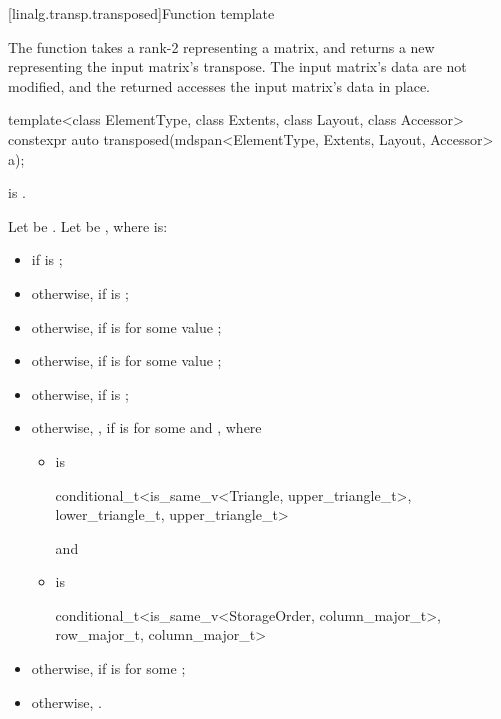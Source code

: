 [linalg.transp.transposed]{Function template }

\pnum
The  function
takes a rank-2  representing a matrix, and
returns a new  representing the input matrix's transpose.
The input matrix's data are not modified, and
the returned  accesses the input matrix's data in place.
%
\begin{itemdecl}
  template<class ElementType, class Extents, class Layout, class Accessor>
    constexpr auto transposed(mdspan<ElementType, Extents, Layout, Accessor> a);
\end{itemdecl}

\begin{itemdescr}
\pnum
\mandates
{} is .

\pnum
Let  be
.
Let  be
,
where  is:
\begin{itemize}
\item
{} if  is ;
\item
otherwise,  if  is ;
\item
otherwise,  if  is\newline
{}
for some  value ;
\item
otherwise,  if  is\newline
{}
for some  value ;
\item
otherwise,  if  is ;
\item
otherwise,
,
if  is\newline
{}
for some  and , where
\begin{itemize}
\item
{} is
\begin{codeblock}
conditional_t<is_same_v<Triangle, upper_triangle_t>,
              lower_triangle_t, upper_triangle_t>
\end{codeblock}
and
\item
{} is
\begin{codeblock}
conditional_t<is_same_v<StorageOrder, column_major_t>, row_major_t, column_major_t>
\end{codeblock}
\end{itemize}
\item
otherwise, 
if  is 
for some ;
\item
otherwise, .
\end{itemize}


\end{itemdescr}
